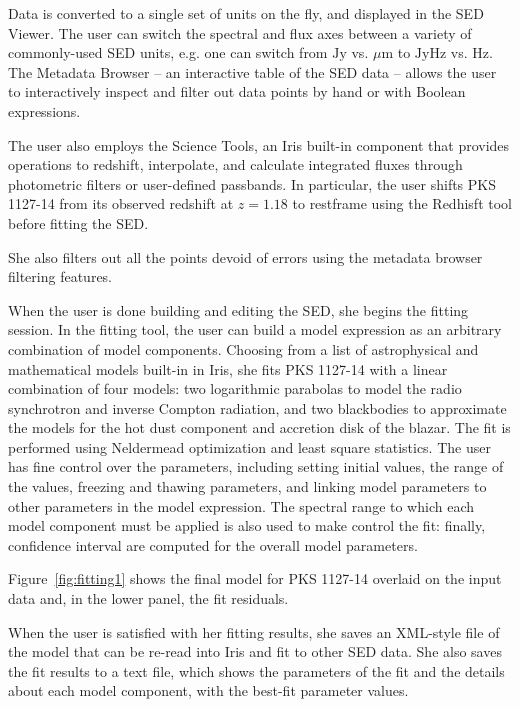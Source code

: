 \documentclass[final,5p]{elsarticle}
\begin{document}
Data is converted to a single set of units on the fly, and displayed in the SED Viewer. The user can switch the spectral and flux axes between a variety of commonly-used SED units, e.g. one can switch from $\mathrm{Jy}$ vs. ${\mu}\mathrm{m}$ to $\mathrm{Jy}\mathrm{Hz}$ vs. $\mathrm{Hz}$. The Metadata Browser -- an interactive table of the SED data -- allows the user to interactively inspect and filter out data points by hand or with Boolean expressions.

The user also employs the Science Tools, an Iris built-in component that provides operations to redshift, interpolate, and calculate integrated fluxes through photometric filters or user-defined passbands. In particular, the user shifts PKS 1127-14 from its observed redshift at $z=1.18$ to restframe using the Redhisft tool before fitting the SED.

She also filters out all the points devoid of errors using the metadata browser filtering features.

When the user is done building and editing the SED, she begins the fitting session. In the fitting tool, the user can build a model expression as an arbitrary combination of model components. Choosing from a list of astrophysical and mathematical models built-in in Iris, she fits PKS 1127-14 with a linear combination of four models: two logarithmic parabolas to model the radio synchrotron and inverse Compton radiation, and two blackbodies to approximate the models for the hot dust component and accretion disk of the blazar. The fit is performed using Neldermead optimization and least square statistics. The user has fine control over the parameters, including setting initial values, the range of the values, freezing and thawing parameters, and linking model parameters to other parameters in the model expression. The spectral range to which each model component must be applied is also used to make control the fit: finally, confidence interval are computed for the overall model parameters.

Figure~\ref{fig:fitting1} shows the final model for PKS 1127-14 overlaid on the input data and, in the lower panel, the fit residuals.

When the user is satisfied with her fitting results, she saves an XML-style file of the model that can be re-read into Iris and fit to other SED data. She also saves the fit results to a text file, which shows the parameters of the fit and the details about each model component, with the best-fit parameter values.
\end{document}
